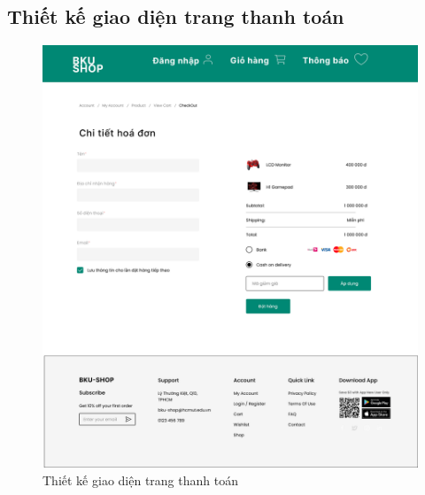 \subsection {Thiết kế giao diện trang thanh toán}
\begin{figure}[H]
    \begin{center}
    \includegraphics[scale=0.2]{images/hieu/chap-4/payment.jpg}
    \vspace*{5mm}
    \caption{Thiết kế giao diện trang thanh toán}
    \end{center}
\end{figure}
